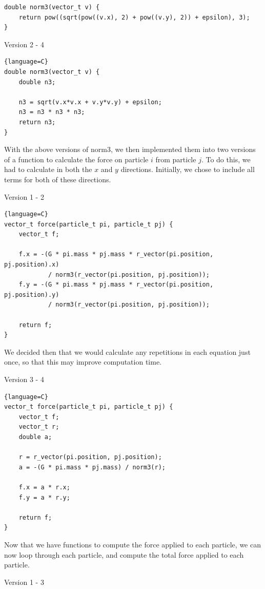 \documentclass{article}
\begin{document}
\begin{lstlisting}
double norm3(vector_t v) {
    return pow((sqrt(pow((v.x), 2) + pow((v.y), 2)) + epsilon), 3);
}
\end{lstlisting}
\vspace{0.3cm}
\begin{center}
    Version 2 - 4
\end{center}
\begin{lstlisting}{language=C}
double norm3(vector_t v) {
    double n3;

    n3 = sqrt(v.x*v.x + v.y*v.y) + epsilon;
    n3 = n3 * n3 * n3;
    return n3;
}
\end{lstlisting}
With the above versions of norm3, we then implemented them into two versions of a function to calculate the force on particle $i$ from particle $j$. To do this, we had to calculate in both the $x$ and $y$ directions. Initially, we chose to include all terms for both of these directions.
\begin{center}
    Version 1 - 2
\end{center}
\begin{lstlisting}{language=C}
vector_t force(particle_t pi, particle_t pj) {
    vector_t f;

    f.x = -(G * pi.mass * pj.mass * r_vector(pi.position, pj.position).x)
            / norm3(r_vector(pi.position, pj.position));
    f.y = -(G * pi.mass * pj.mass * r_vector(pi.position, pj.position).y)
            / norm3(r_vector(pi.position, pj.position));

    return f;
}
\end{lstlisting}
We decided then that we would calculate any repetitions in each equation just once, so that this may improve computation time.
\begin{center}
    Version 3 - 4
\end{center}
\begin{lstlisting}{language=C}
vector_t force(particle_t pi, particle_t pj) {
    vector_t f;
    vector_t r;
    double a;

    r = r_vector(pi.position, pj.position);
    a = -(G * pi.mass * pj.mass) / norm3(r);

    f.x = a * r.x;
    f.y = a * r.y;

    return f;
}
\end{lstlisting}
Now that we have functions to compute the force applied to each particle, we can now loop through each particle, and compute the total force applied to each particle.
\begin{center}
    Version 1 - 3
\end{center}
\end{document}

